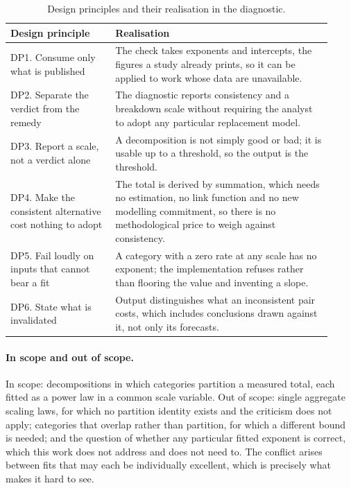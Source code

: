\documentclass[11pt]{article}
\begin{document}
\begin{table}[t]
\centering
\caption{Design principles and their realisation in the diagnostic.}
\label{tab:dp}
\small
\begin{tabular}{@{}p{0.30\linewidth}p{0.62\linewidth}@{}}
\toprule
\textbf{Design principle} & \textbf{Realisation} \\
\midrule
DP1. Consume only what is published & The check takes exponents and intercepts, the
figures a study already prints, so it can be applied to work whose data are
unavailable. \\
DP2. Separate the verdict from the remedy & The diagnostic reports consistency
and a breakdown scale without requiring the analyst to adopt any particular
replacement model. \\
DP3. Report a scale, not a verdict alone & A decomposition is not simply good or
bad; it is usable up to a threshold, so the output is the threshold. \\
DP4. Make the consistent alternative cost nothing to adopt & The total is derived
by summation, which needs no estimation, no link function and no new modelling
commitment, so there is no methodological price to weigh against consistency. \\
DP5. Fail loudly on inputs that cannot bear a fit & A category with a zero rate at
any scale has no exponent; the implementation refuses rather than flooring the
value and inventing a slope. \\
DP6. State what is invalidated & Output distinguishes what an inconsistent pair
costs, which includes conclusions drawn against it, not only its forecasts. \\
\bottomrule
\end{tabular}
\end{table}

\paragraph{In scope and out of scope.}
In scope: decompositions in which categories partition a measured total, each fitted
as a power law in a common scale variable. Out of scope: single aggregate scaling
laws, for which no partition identity exists and the criticism does not apply;
categories that overlap rather than partition, for which a different bound is
needed; and the question of whether any particular fitted exponent is correct, which
this work does not address and does not need to. The conflict arises between fits
that may each be individually excellent, which is precisely what makes it hard to
see.
\end{document}
